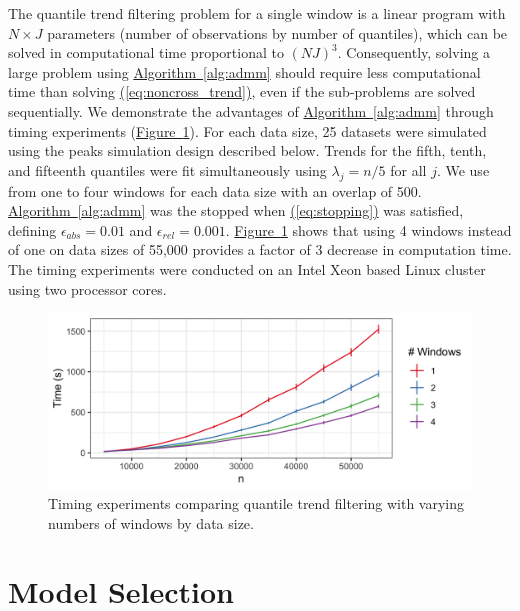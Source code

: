 \documentclass[aoas]{imsart}
\newcommand{\Eqn}[1]{\hyperref[eq:#1]{{\rm (\ref*{eq:#1})}}} %
\newcommand{\Fig}[1]{\hyperref[fig:#1]{Figure~\ref*{fig:#1}}} %
\newcommand{\Alg}[1]{\hyperref[alg:#1]{Algorithm~\ref*{alg:#1}}} %
\newcommand{\Eqn}[1]{{(\ref{eq:#1})}} %
\newcommand{\Fig}[1]{{Figure~\ref{fig:#1}}} %
\newcommand{\Alg}[1]{{Algorithm~\ref{alg:#1}}} %
\begin{document}
The quantile trend filtering problem for a single window is a linear program with $N\times J$ parameters (number of observations by number of quantiles), which can be solved in computational time proportional to $(NJ)^3$.  Consequently, solving a large problem using \Alg{admm} should require less computational time than solving \Eqn{noncross_trend}, even if the sub-problems are solved sequentially. We demonstrate the advantages of \Alg{admm} through timing experiments (\Fig{timing}). For each data size, 25 datasets were simulated using the peaks simulation design described below. Trends for the fifth, tenth, and fifteenth quantiles were fit simultaneously using $\lambda_j = n/5$ for all $j$. We use from one to four windows for each data size with an overlap of 500. \Alg{admm} was the stopped when \Eqn{stopping} was satisfied, defining $\epsilon_{abs} = 0.01$ and $\epsilon_{rel} = 0.001$. \Fig{timing} shows that using 4 windows instead of one on data sizes of 55,000 provides a factor of 3 decrease in computation time. The timing experiments were conducted on an Intel Xeon based Linux cluster using two processor cores.


\begin{figure}[!t]
	\centering
	\includegraphics[width = 0.7\linewidth]{Figures/Fig_timing_experiment.png}
	\caption{Timing experiments comparing quantile trend filtering with varying numbers of windows by data size.}
	\label{fig:timing}
\end{figure}



\section{Model Selection}
\label{sec:lambda_choice}
\end{document}
